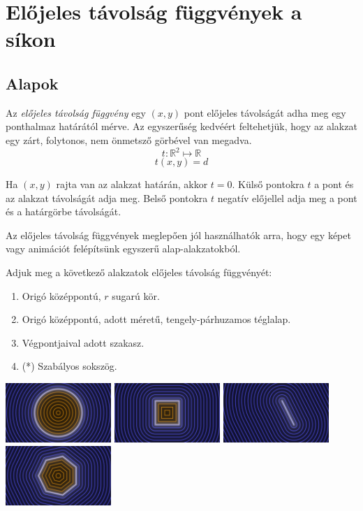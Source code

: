 \section{Előjeles távolság függvények a síkon}

\subsection{Alapok}

\begin{tcolorbox}[title=Előjeles távolság függvény (signed distance function)]
  Az \emph{előjeles távolság függvény} egy $(x,y)$ pont előjeles távolságát adha meg egy ponthalmaz határától mérve.
  Az egyszerűség kedvéért feltehetjük, hogy az alakzat egy zárt, folytonos, nem önmetsző görbével van megadva.
  $$ t: \mathbb{R}^2 \mapsto \mathbb{R}$$
  $$ t(x, y) = d$$

  Ha $(x,y)$ rajta van az alakzat határán, akkor $t = 0$. Külső pontokra $t$ a pont és az alakzat távolságát adja meg.
  Belső pontokra $t$ negatív előjellel adja meg a pont és a határgörbe távolságát.
  
  Az előjeles távolság függvények meglepően jól használhatók arra, hogy egy képet vagy animációt felépítsünk egyszerű
  alap-alakzatokból.
  \end{tcolorbox}

\matfeladatok


Adjuk meg a következő alakzatok előjeles távolság függvényét:

\begin{enumerate}[resume]
  \item Origó középpontú, $r$ sugarú kör.
  \item Origó középpontú, adott méretű, tengely-párhuzamos téglalap.
  \item Végpontjaival adott szakasz.
  \item (*) Szabályos sokszög.
\end{enumerate}

\includegraphics[width=4cm]{images/sdCircle.png}
\includegraphics[width=4cm]{images/sdSquare.png}
\includegraphics[width=4cm]{images/sdSegment.png}
\includegraphics[width=4cm]{images/sdNgon.png}


